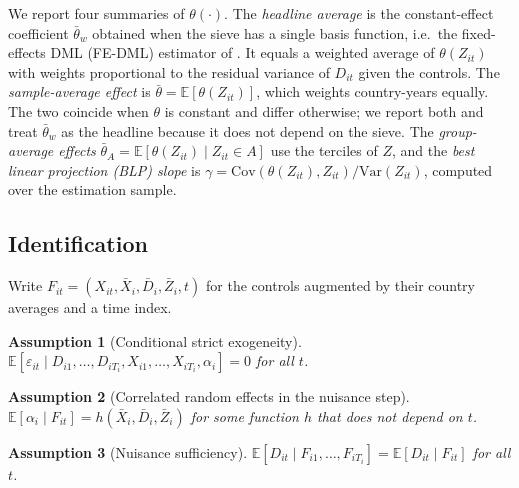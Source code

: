 \documentclass[pdflatex,sn-basic]{sn-jnl}%
\theoremstyle{thmstyleone}
\newtheorem{assumption}{Assumption}
\theoremstyle{thmstyletwo}
\newcommand{\E}{\mathbb{E}}
\begin{document}
We report four summaries of $\theta(\cdot)$. The \emph{headline average} is the constant-effect coefficient $\bar\theta_w$ obtained when the sieve has a single basis function, i.e.\ the fixed-effects DML (FE-DML) estimator of \citet{clarke2023panel}. It equals a weighted average of $\theta(Z_{it})$ with weights proportional to the residual variance of $D_{it}$ given the controls. The \emph{sample-average effect} is $\bar\theta=\E[\theta(Z_{it})]$, which weights country-years equally. The two coincide when $\theta$ is constant and differ otherwise; we report both and treat $\bar\theta_w$ as the headline because it does not depend on the sieve. The \emph{group-average effects} $\bar\theta_A=\E[\theta(Z_{it})\mid Z_{it}\in A]$ use the terciles of $Z$, and the \emph{best linear projection (BLP) slope} is $\gamma=\mathrm{Cov}(\theta(Z_{it}),Z_{it})/\mathrm{Var}(Z_{it})$, computed over the estimation sample.

\subsection{Identification}

Write $F_{it}=(X_{it},\bar X_i,\bar D_i,\bar Z_i,t)$ for the controls augmented by their country averages and a time index.

\begin{assumption}[Conditional strict exogeneity]\label{as:exo}
$\E[\varepsilon_{it}\mid D_{i1},\dots,D_{iT_i},X_{i1},\dots,X_{iT_i},\alpha_i]=0$ for all $t$.
\end{assumption}

\begin{assumption}[Correlated random effects in the nuisance step]\label{as:cre}
$\E[\alpha_i\mid F_{it}]=h(\bar X_i,\bar D_i,\bar Z_i)$ for some function $h$ that does not depend on $t$.
\end{assumption}

\begin{assumption}[Nuisance sufficiency]\label{as:suff}
$\E[D_{it}\mid F_{i1},\dots,F_{iT_i}]=\E[D_{it}\mid F_{it}]$ for all $t$.
\end{assumption}
\end{document}
